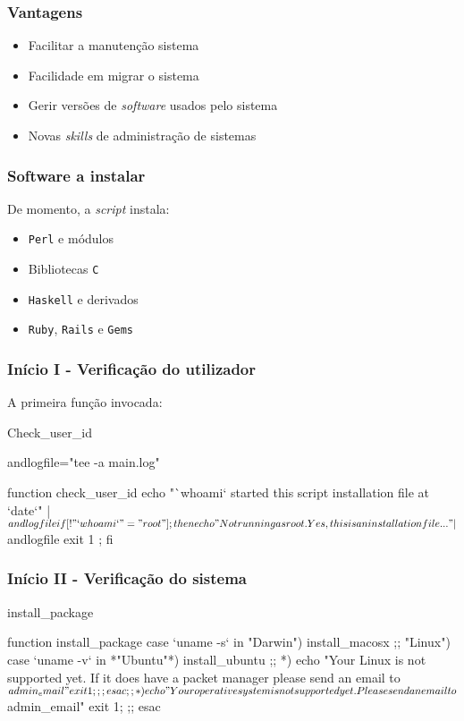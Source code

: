 \documentclass{beamer}
\begin{document}
\begin{frame}[fragile] \frametitle{Vantagens}
\begin{itemize}
 \item Facilitar a manutenção sistema
 \item Facilidade em migrar o sistema
 \item Gerir versões de \emph{software} usados pelo sistema
 \item Novas \emph{skills} de administração de sistemas
\end{itemize}
\end{frame}

\begin{frame}[fragile] \frametitle{Software a instalar}
De momento, a \emph{script} instala:

\begin{itemize}
 \item \texttt{Perl} e módulos
 \item Bibliotecas \texttt{C} 
 \item \texttt{Haskell} e derivados
 \item \texttt{Ruby}, \texttt{Rails} e \texttt{Gems}
\end{itemize}
\end{frame}

\begin{frame}[fragile] \frametitle{Início I - Verificação do utilizador}
A primeira função invocada:
\begin{block}{Check\_user\_id}
\begin{haskell}
andlogfile="tee -a main.log"

function check_user_id {
        echo "`whoami` started this script installation file at `date`" | $andlogfile
        if [ ! "`whoami`" = "root" ]; then
                echo "Not running as root. Yes, this is an installation file..." | $andlogfile
                exit 1 ;
        fi
}
\end{haskell}
\end{block}
\end{frame}

\begin{frame}[fragile] \frametitle{Início II - Verificação do sistema}
\begin{block}{install\_package}
\begin{haskell}
function install_package {
        case `uname -s` in
                "Darwin")       install_macosx
                                ;;
                "Linux")        case `uname -v` in
                                *"Ubuntu"*)   install_ubuntu
                                              ;;
                                *)            echo "Your Linux is not supported yet. If it does have a packet manager please send an email to $admin_email"
                                              exit 1;
                                              ;;
                                esac
                        ;;
                *)		echo "Your operative system is not supported yet. Please send an email to $admin_email"
                        exit 1;
                        ;;
        esac
}
\end{haskell}
\end{block}
\end{frame}
\end{document}
